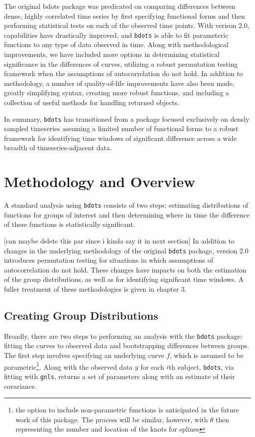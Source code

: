 \documentclass{article}
\newcommand{\xt}{\texttt}%
\begin{document}
The original bdots package was predicated on comparing differences between dense, highly correlated time series by first specifying functional forms and then performing statistical tests on each of the observed time points. With verison 2.0, capabilities have drastically improved, and \xt{bdots} is able to fit parameteric functions to any type of data observed in time. Along with methodological improvements, we have included more options in determining statistical significance in the differences of curves, utilizing a {\color{red} robust} permutation testing framework when the assumptions of autocorrelation do not hold. In addition to methodology, a number of quality-of-life improvements have also been made, greatly simplifying syntax, creating more {\color{red} robust} functions, and including a collection of useful methods for handling returned objects.

In summary, \texttt{bdots} has transitioned from a package focused exclusively on densly sampled timeseries assuming a limited number of functional forms to a {\color{red} robust} framework for identifying time windows of significant difference across a wide breadth of timeseries-adjacent data. 


\section{Methodology and Overview} 

A standard analysis using \xt{bdots} consists of two steps: estimating distributions of functions for groups of interest and then determining where in time the difference of these functions is statistically significant.


[can maybe delete this par since i kinda say it in next section] In addition to changes in the underlying methodology of the original \xt{bdots} package, version 2.0 introduces permutation testing for situations in which assumptions of autocorrelation do not hold. These changes have impacts on both the estimation of the group distributions, as well as for identifying significant time windows. A fuller treatment of these methodologies is given in chapter 3.

\subsection{Creating Group Distributions}

Broadly, there are two steps to performing an analysis with the \xt{bdots} package: fitting the curves to observed data and bootstrapping differences between groups. The first step involves specifying an underlying curve $f$, which is assumed to be parametric\footnote{the option to include non-parametric functions is anticipated in the future work of this package. The process will be similar, however, with $\theta$ then representing the number and location of the knots for splines}. Along with the observed data $y$ for each $i$th subject, \xt{bdots}, via fitting with \xt{gnls}, returns a set of parameters along with an estimate of their covariance.
\end{document}
